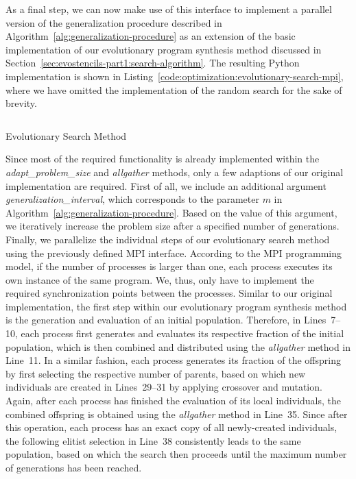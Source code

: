 As a final step, we can now make use of this interface to implement a parallel version of the generalization procedure described in Algorithm~\ref{alg:generalization-procedure} as an extension of the basic implementation of our evolutionary program synthesis method discussed in Section~\ref{sec:evostencils-part1:search-algorithm}.
The resulting Python implementation is shown in Listing~\ref{code:optimization:evolutionary-search-mpi}, where we have omitted the implementation of the random search for the sake of brevity.
\begin{listing}
	\inputminted[linenos]{python}{evostencils/optimization/evolutionary_search_mpi.py}
	\caption{Evolutionary Search Method}
	\label{code:optimization:evolutionary-search-mpi}
\end{listing}
Since most of the required functionality is already implemented within the \emph{adapt\_problem\_size} and \emph{allgather} methods, only a few adaptions of our original implementation are required.
First of all, we include an additional argument \emph{generalization\_interval}, which corresponds to the parameter $m$ in Algorithm~\ref{alg:generalization-procedure}.
Based on the value of this argument, we iteratively increase the problem size after a specified number of generations.
Finally, we parallelize the individual steps of our evolutionary search method using the previously defined MPI interface.
According to the MPI programming model, if the number of processes is larger than one, each process executes its own instance of the same program.
We, thus, only have to implement the required synchronization points between the processes.
Similar to our original implementation, the first step within our evolutionary program synthesis method is the generation and evaluation of an initial population.
Therefore, in Lines~7--10, each process first generates and evaluates its respective fraction of the initial population, which is then combined and distributed using the \emph{allgather} method in Line~11.
In a similar fashion, each process generates its fraction of the offspring by first selecting the respective number of parents, based on which new individuals are created in Lines~29--31 by applying crossover and mutation.
Again, after each process has finished the evaluation of its local individuals, the combined offspring is obtained using the \emph{allgather} method in Line~35.
Since after this operation, each process has an exact copy of all newly-created individuals, the following elitist selection in Line~38 consistently leads to the same population, based on which the search then proceeds until the maximum number of generations has been reached.

